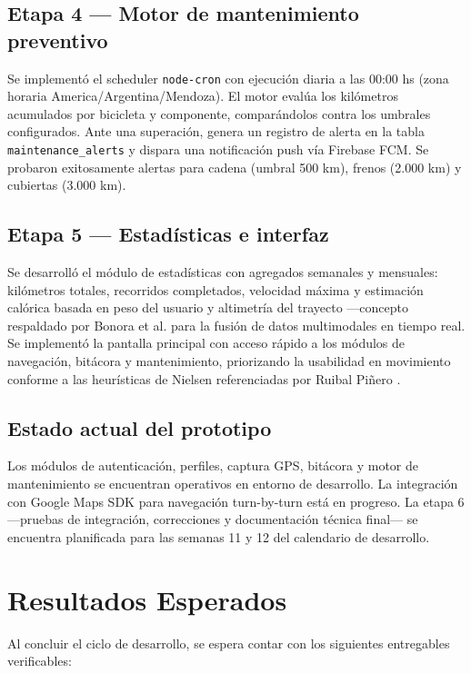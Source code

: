 \documentclass{llncs}
\begin{document}
\subsection{Etapa 4 — Motor de mantenimiento preventivo}

Se implementó el scheduler \texttt{node-cron} con ejecución diaria a las 00:00 hs (zona horaria America/Argentina/Mendoza). El motor evalúa los kilómetros acumulados por bicicleta y componente, comparándolos contra los umbrales configurados. Ante una superación, genera un registro de alerta en la tabla \texttt{maintenance\_alerts} y dispara una notificación push vía Firebase FCM. Se probaron exitosamente alertas para cadena (umbral 500 km), frenos (2.000 km) y cubiertas (3.000 km).

\subsection{Etapa 5 — Estadísticas e interfaz}

Se desarrolló el módulo de estadísticas con agregados semanales y mensuales: kilómetros totales, recorridos completados, velocidad máxima y estimación calórica basada en peso del usuario y altimetría del trayecto —concepto respaldado por Bonora et al. \cite{Bonora2025} para la fusión de datos multimodales en tiempo real. Se implementó la pantalla principal con acceso rápido a los módulos de navegación, bitácora y mantenimiento, priorizando la usabilidad en movimiento conforme a las heurísticas de Nielsen referenciadas por Ruibal Piñero \cite{Ruibal2023}.

\subsection{Estado actual del prototipo}

Los módulos de autenticación, perfiles, captura GPS, bitácora y motor de mantenimiento se encuentran operativos en entorno de desarrollo. La integración con Google Maps SDK para navegación turn-by-turn está en progreso. La etapa 6 —pruebas de integración, correcciones y documentación técnica final— se encuentra planificada para las semanas 11 y 12 del calendario de desarrollo.

\section{Resultados Esperados}

Al concluir el ciclo de desarrollo, se espera contar con los siguientes entregables verificables:
\end{document}
